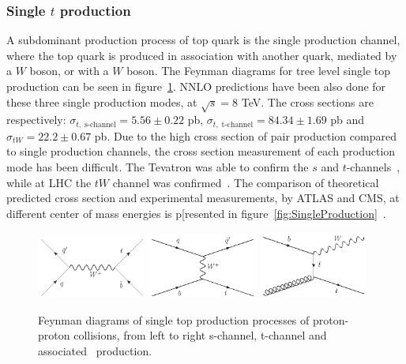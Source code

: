 
\subsubsection{Single $t$ production}
\label{subsec:topsing}

A subdominant production process of top quark is the single production channel, where the top quark is produced in association with another quark, mediated by a $W$ boson, or with a $W$ boson. The Feynman diagrams for tree level single top production can be seen in figure~\ref{fig:SingleProductionFD}. NNLO predictions have been also done for these three single production modes, at $\sqrt{s}=8$ TeV. The cross sections are respectively: $\sigma_{t,\; \text{s-channel}}=5.56\pm0.22$ pb, $\sigma_{t,\; \text{t-channel}}=84.34\pm1.69$ pb and $\sigma_{tW}=22.2\pm0.67$ pb. Due to the high cross section of pair production compared to single production channels, the cross section measurement of each production mode has been difficult. The Tevatron was able to confirm the $s$ and $t$-channels~\cite{Abazov:2009ii, Aaltonen:2009jj}, while at LHC the $tW$ channel was confirmed~\cite{Aad:2012xca, Chatrchyan:1642680}. The comparison of theoretical predicted cross section and experimental measurements, by ATLAS and CMS, at different center of mass energies is p[resented in figure~\ref{fig:SingleProduction}~\cite{TOPLHCWG}.

\begin{figure}[!Hhtbp]
  \begin{center}
    \includegraphics[width=0.32\textwidth]{figs/Schannel_top_single.jpg}
    \includegraphics[width=0.32\textwidth]{figs/Tchannel_top_single.jpg}
    \includegraphics[width=0.32\textwidth]{figs/TWchannel_top_single.jpg}
    \caption{Feynman diagrams of single top production processes of proton-proton collisions, from left to right s-channel, t-channel and associated \W~production.}
    \label{fig:SingleProductionFD}
  \end{center}
\end{figure}

